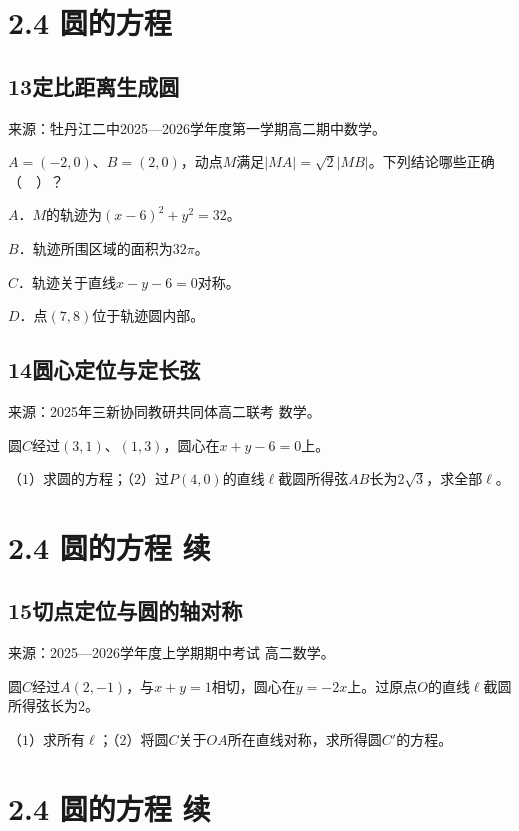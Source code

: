 \documentclass[UTF8,11pt,a4paper,fontset=windows]{ctexart}
\newcommand{\qhead}[2]{\subsection{#1\texorpdfstring{\quad}{ }#2}}
\newcommand{\qsource}[1]{{\footnotesize 来源：#1。\par}}
\begin{document}
\mbox{}

\clearpage

\section{2.4 圆的方程}

\qhead{13}{定比距离生成圆}
\qsource{牡丹江二中2025—2026学年度第一学期高二期中数学}
\(A= \left(- 2,\allowbreak 0\right)\)、\(B= \left(2,\allowbreak 0\right)\)，动点\(M\)满足\(\lvert MA\rvert = \sqrt{2}\lvert MB\rvert \)。下列结论哪些正确（　）？\par
\(A\)．\(M\)的轨迹为\(\left(x- 6\right)^{2}+ y^{2}= 32\)。\par
\(B\)．轨迹所围区域的面积为\(32\pi \)。\par
\(C\)．轨迹关于直线\(x- y- 6= 0\)对称。\par
\(D\)．点\(\left(7,\allowbreak 8\right)\)位于轨迹圆内部。\par
\vspace{12mm}\vfill

\qhead{14}{圆心定位与定长弦}
\qsource{2025年三新协同教研共同体高二联考 数学}
圆\(C\)经过\(\left(3,\allowbreak 1\right)\)、\(\left(1,\allowbreak 3\right)\)，圆心在\(x+ y- 6= 0\)上。\par
（\(1\)）求圆的方程；（\(2\)）过\(P\left(4,\allowbreak 0\right)\)的直线\(\ell \)截圆所得弦\(AB\)长为\(2\sqrt{3}\)，求全部\(\ell \)。\par
\vspace{12mm}\vfill

\mbox{}

\clearpage

\section{2.4 圆的方程 续}

\qhead{15}{切点定位与圆的轴对称}
\qsource{2025—2026学年度上学期期中考试 高二数学}
圆\(C\)经过\(A\left(2,\allowbreak - 1\right)\)，与\(x+ y= 1\)相切，圆心在\(y= - 2x\)上。过原点\(O\)的直线\(\ell \)截圆所得弦长为\(2\)。\par
（\(1\)）求所有\(\ell \)；（\(2\)）将圆\(C\)关于\(OA\)所在直线对称，求所得圆\(C'\)的方程。\par
\vspace{12mm}\vfill

\mbox{}

\clearpage

\section{2.4 圆的方程 续}
\end{document}
